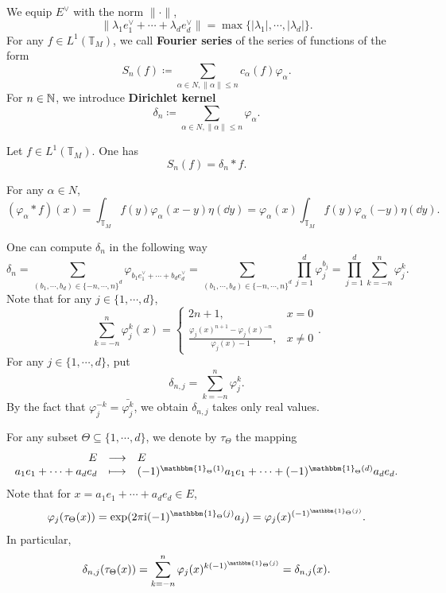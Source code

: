 \begin{definitionenv}
    We equip $E^\vee$ with the norm $\|\cdot\|$,
    $$\|\lambda_1 e^\vee_1 + \cdots + \lambda_d e^\vee_d\| = \max\{|\lambda_1|, \cdots, |\lambda_d|\}.$$
    For any $f \in L^1(\mathbb{T}_{M})$, we call \textbf{Fourier series} of the series of functions of the form
    $$S_{n} (f) \coloneq \sum_{\alpha \in N, \|\alpha\| \leq n} c_{\alpha}(f) \varphi_{\alpha}.$$
    For $n \in \mathbb{N}$, we introduce \textbf{Dirichlet kernel}
    $$\delta_{n} \coloneq \sum_{\alpha \in N, \|\alpha\| \le n} \varphi_{\alpha}.$$
\end{definitionenv}

\begin{propositionenv}\label{prop:8.5.4}
    Let $f \in L^1(\mathbb{T}_{M})$.
    One has
    $$S_n(f) = \delta_{n} * f.$$
\end{propositionenv}
\begin{proofenv}
    For any $\alpha \in N$,
    $$(\varphi_{\alpha} * f)(x) = \int_{\mathbb{T}_{M}} f(y) \varphi_{\alpha}(x - y) \eta(\dd y) = \varphi_{\alpha}(x) \int_{\mathbb{T}_{M}}f(y) \varphi_{\alpha}(-y)\eta(\dd y).$$
\end{proofenv}

\begin{remark}\label{rem:8.5.5}
    One can compute $\delta_n$ in the following way
    $$\delta_n = \sum_{(b_1,\cdots,b_d) \in \{-n,\cdots,n\}^d} \varphi_{b_1e^\vee_1 + \cdots + b_de^\vee_d} = \sum_{(b_1,\cdots,b_d) \in \{-n,\cdots,n\}^d} \prod_{j = 1}^{d} \varphi_{j}^{b_j} = \prod_{j=1}^{d} \sum_{k=-n}^{n} \varphi_j^k.$$
    Note that for any $j \in \{1,\cdots,d\}$,
    $$\sum_{k=-n}^{n} \varphi_j^k (x) = \begin{cases}
        2n+1, & x = 0\\
        \frac{\varphi_j(x)^{n+1} - \varphi_{j}(x)^{-n}}{\varphi_{j}(x) - 1}, & x \neq 0
    \end{cases}.$$
    For any $j \in \{1,\cdots,d\}$, put
    $$\delta_{n,j} = \sum_{k=-n}^{n} \varphi_j^k.$$
    By the fact that $\varphi_{j}^{-k} = \bar{\varphi_{j}^{k}}$, we obtain $\delta_{n,j}$ takes only real values.
\end{remark}

\begin{definitionenv}
    For any subset $\Theta \subseteq \{1,\cdots,d\}$, we denote by $\tau_{\Theta}$ the mapping
    $$\begin{array}{rcl}
        E & \longrightarrow & E\\
        a_1 e_1 + \cdots + a_d e_d & \longmapsto & (-1)^{\mathbbm{1}_{\Theta}(1)} a_1 e_1 + \cdots + (-1)^{\mathbbm{1}_{\Theta}(d)} a_d e_d.
    \end{array}$$
    Note that for $x = a_1 e_1 + \cdots + a_d e_d \in E$,
    $$\varphi_{j} (\tau_{\Theta}(x)) = \exp(2 \pi \mathrm{i} (-1)^{\mathbbm{1}_{\Theta}(j)} a_j) = \varphi_{j} (x)^{(-1)^{\mathbbm{1}_{\Theta}(j)}}.$$
    In particular,
    $$\delta_{n,j} (\tau_{\Theta}(x)) = \sum_{k= - n}^{n} \varphi_{j}(x)^{k(-1)^{\mathbbm{1}_{\Theta}(j)}} = \delta_{n,j}(x).$$
\end{definitionenv}

